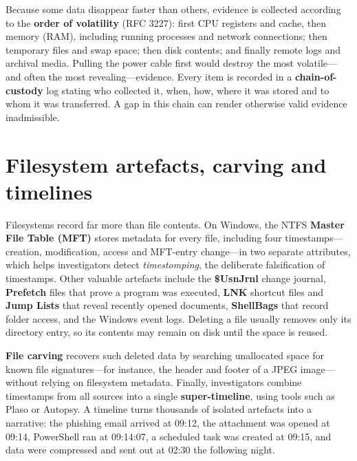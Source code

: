 \documentclass[11pt,openany]{book}
\begin{document}
Because some data disappear faster than others, evidence is collected according to the \textbf{order of volatility} (RFC 3227): first CPU registers and cache, then memory (RAM), including running processes and network connections; then temporary files and swap space; then disk contents; and finally remote logs and archival media. Pulling the power cable first would destroy the most volatile—and often the most revealing—evidence. Every item is recorded in a \textbf{chain-of-custody} log stating who collected it, when, how, where it was stored and to whom it was transferred. A gap in this chain can render otherwise valid evidence inadmissible.

\section{Filesystem artefacts, carving and timelines}\label{sec:12.6}
Filesystems record far more than file contents. On Windows, the NTFS \textbf{Master File Table (MFT)} stores metadata for every file, including four timestamps—creation, modification, access and MFT-entry change—in two separate attributes, which helps investigators detect \emph{timestomping}, the deliberate falsification of timestamps. Other valuable artefacts include the \textbf{\$UsnJrnl} change journal, \textbf{Prefetch} files that prove a program was executed, \textbf{LNK} shortcut files and \textbf{Jump Lists} that reveal recently opened documents, \textbf{ShellBags} that record folder access, and the Windows event logs. Deleting a file usually removes only its directory entry, so its contents may remain on disk until the space is reused.

\textbf{File carving} recovers such deleted data by searching unallocated space for known file signatures—for instance, the header and footer of a JPEG image—without relying on filesystem metadata. Finally, investigators combine timestamps from all sources into a single \textbf{super-timeline}, using tools such as Plaso or Autopsy. A timeline turns thousands of isolated artefacts into a narrative: the phishing email arrived at 09:12, the attachment was opened at 09:14, PowerShell ran at 09:14:07, a scheduled task was created at 09:15, and data were compressed and sent out at 02:30 the following night.
\end{document}
